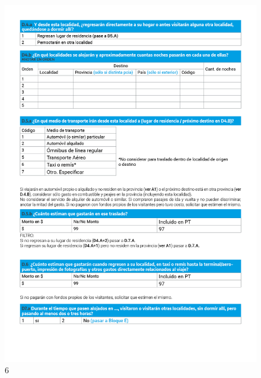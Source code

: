 \documentclass[
]{book}
\begin{document}
\begin{figure}
\includegraphics[width=17.22in]{imagenes/graf06} \caption{6}\label{fig:006}
\end{figure}
\end{document}
